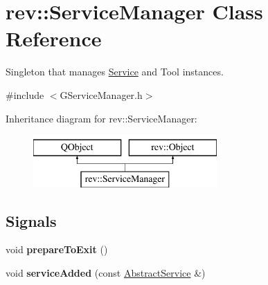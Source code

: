 \hypertarget{classrev_1_1_service_manager}{}\section{rev\+::Service\+Manager Class Reference}
\label{classrev_1_1_service_manager}


Singleton that manages \mbox{\hyperlink{classrev_1_1_service}{Service}} and Tool instances.  




{\ttfamily \#include $<$G\+Service\+Manager.\+h$>$}

Inheritance diagram for rev\+::Service\+Manager\+:\begin{figure}[H]
\begin{center}
\leavevmode
\includegraphics[height=2.000000cm]{classrev_1_1_service_manager}
\end{center}
\end{figure}
\subsection*{Signals}
\begin{DoxyCompactItemize}
\item 
\mbox{\label{classrev_1_1_service_manager_a32c957d349480d9faa79939b24a3f30e}} 
void {\bfseries prepare\+To\+Exit} ()
\item 
\mbox{\label{classrev_1_1_service_manager_a79e6402440decc8eebed1fb1fcbb7bd9}} 
void {\bfseries service\+Added} (const \mbox{\hyperlink{classrev_1_1_abstract_service}{Abstract\+Service}} \&)
\end{DoxyCompactItemize}
